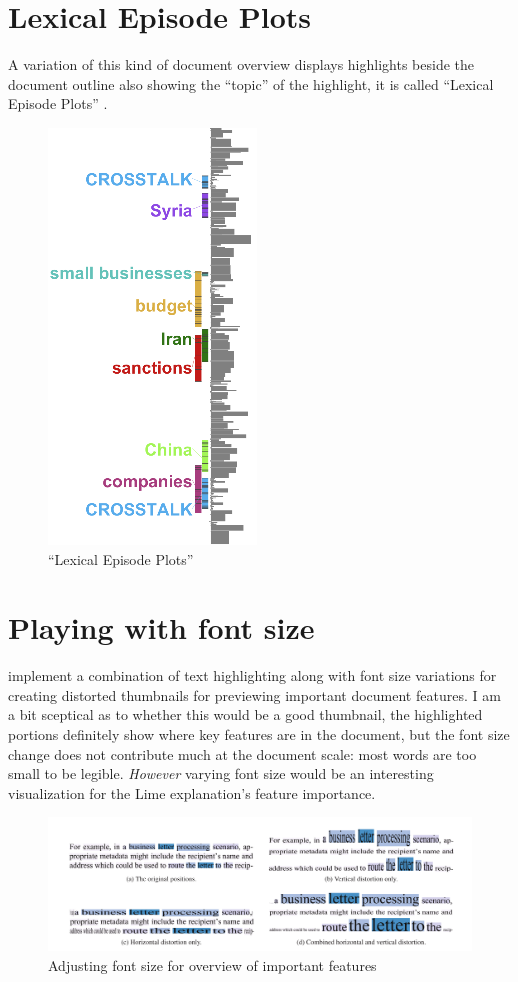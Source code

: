 \documentclass[12pt,a4paper,british]{report}
\begin{document}
\section*{Lexical Episode Plots}

A variation of this kind of document overview displays highlights beside the document outline also showing the ``topic'' of the highlight, it is called ``Lexical Episode Plots'' \autocite{el-assadyVisArgueVisualText2016,goldExploratoryTextAnalysis2015}.

\begin{figure}[H]
  \centering
  \includegraphics[height=0.5\textwidth]{static/topic-overview.png}
  \caption{``Lexical Episode Plots''\\ \protect\autocite{goldExploratoryTextAnalysis2015}}
  \label{fig:j24}
\end{figure}

\section*{Playing with font size}

\textcite{stoffelDocumentThumbnailsVariable2012} implement a combination of text highlighting along with font size variations for creating distorted thumbnails for previewing important document features.
I am a bit sceptical as to whether this would be a good thumbnail, the highlighted portions definitely show where key features are in the document, but the font size change does not contribute much at the document scale: most words are too small to be legible.
\textit{However} varying font size would be an interesting visualization for the Lime explanation's feature importance.

\begin{figure}[H]
  \centering
  \includegraphics[width=\textwidth]{static/font-size.png}
  \caption{Adjusting font size for overview of important features \\ \protect\autocite{stoffelDocumentThumbnailsVariable2012}}
  \label{fig:font-size}
\end{figure}
\end{document}
